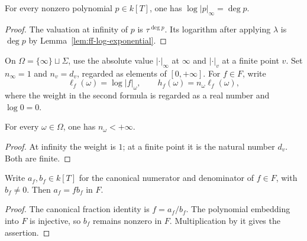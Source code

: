 \begin{lemma}\label{lem:ff-infinity-polynomial-log}
\leanok
{}
For every nonzero polynomial $p\in k[T]$, one has
$\log|p|_\infty=\deg p$.
\end{lemma}
\begin{proof}
The valuation at infinity of $p$ is $\tau^{\deg p}$. Its logarithm
after applying $\lambda$ is $\deg p$ by
Lemma~\ref{lem:ff-log-exponential}.
\end{proof}

\begin{definition}
\label{def:ff-point-data}
\leanok
{}
On $\Omega=\{\infty\}\sqcup\Sigma$, use the absolute value
$|\cdot|_\infty$ at $\infty$ and $|\cdot|_v$ at a finite point $v$.
Set $n_\infty=1$ and $n_v=d_v$, regarded as elements of $[0,+\infty]$.
For $f\in F$, write
\[
 \ell_f(\omega)=\log|f|_\omega,\qquad
 h_f(\omega)=n_\omega\ell_f(\omega),
\]
where the weight in the second formula is regarded as a real number
and $\log0=0$.
\end{definition}

\begin{lemma}\label{lem:ff-finite-weights}
\leanok
{}
For every $\omega\in\Omega$, one has $n_\omega<+\infty$.
\end{lemma}
\begin{proof}
At infinity the weight is $1$; at a finite point it is the natural
number $d_v$. Both are finite.
\end{proof}

\begin{lemma}\label{lem:ff-clearing-denominators}
\leanok
{}
Write $a_f,b_f\in k[T]$ for the canonical numerator and denominator of
$f\in F$, with $b_f\ne0$. Then $a_f=f b_f$ in $F$.
\end{lemma}
\begin{proof}
The canonical fraction identity is $f=a_f/b_f$.
The polynomial embedding into $F$ is injective, so $b_f$ remains
nonzero in $F$. Multiplication by it gives the assertion.
\end{proof}

